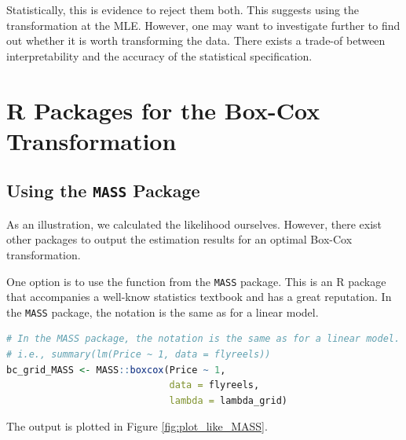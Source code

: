 Statistically, this is evidence to reject them both.
This suggests using the transformation at the MLE.
However, one may want to investigate further 
to find out whether it is worth 
transforming the data. 
There exists a trade-of between interpretability and 
the accuracy of the statistical specification. 


\clearpage
\section{\textsf{R} Packages for the Box-Cox Transformation}
\subsection{Using the \texttt{MASS} Package}

As an illustration, we calculated
the likelihood ourselves.
However, there exist other packages
to output the estimation results for
an optimal Box-Cox transformation.

One option is to use the function from the \texttt{MASS} package.
This is an \textsf{R} package that accompanies a well-know statistics textbook
and has a great reputation. 
In the \texttt{MASS} package, the notation is the same as for a linear model.


\begin{lstlisting}[language=R]
# In the MASS package, the notation is the same as for a linear model.
# i.e., summary(lm(Price ~ 1, data = flyreels))
bc_grid_MASS <- MASS::boxcox(Price ~ 1,
                             data = flyreels,
                             lambda = lambda_grid)
\end{lstlisting}

The output is plotted in Figure \ref{fig:plot_like_MASS}.


